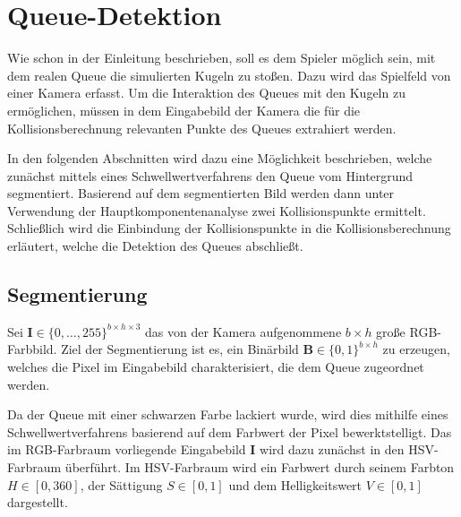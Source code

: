 \section{Queue-Detektion}

Wie schon in der Einleitung beschrieben, soll es dem Spieler möglich sein, mit dem realen Queue die simulierten Kugeln zu stoßen.
Dazu wird das Spielfeld von einer Kamera erfasst. 
Um die Interaktion des Queues mit den Kugeln zu ermöglichen, müssen in dem Eingabebild der Kamera die für die Kollisionsberechnung relevanten Punkte des Queues extrahiert werden.

In den folgenden Abschnitten wird dazu eine Möglichkeit beschrieben, welche zunächst mittels eines Schwellwertverfahrens den Queue vom Hintergrund segmentiert.
Basierend auf dem segmentierten Bild werden dann unter Verwendung der Hauptkomponentenanalyse zwei Kollisionspunkte ermittelt.
Schließlich wird die Einbindung der Kollisionspunkte in die Kollisionsberechnung erläutert, welche die Detektion des Queues abschließt.

\subsection{Segmentierung}
Sei $\textbf{I} \in \{0, \dots, 255\}^{b \times h \times 3}$ das von der Kamera aufgenommene $b \times h$ große RGB-Farbbild.
Ziel der Segmentierung ist es, ein Binärbild $\textbf{B} \in \{0,1\}^{b \times h}$ zu erzeugen, welches die Pixel im Eingabebild charakterisiert, die dem Queue zugeordnet werden.

Da der Queue mit einer schwarzen Farbe lackiert wurde, wird dies mithilfe eines Schwellwertverfahrens basierend auf dem Farbwert der Pixel bewerktstelligt.
Das im RGB-Farbraum vorliegende Eingabebild $\textbf{I}$ wird dazu zunächst in den HSV-Farbraum überführt. 
Im HSV-Farbraum wird ein Farbwert durch seinem Farbton $H \in [0, 360]$, der Sättigung $S \in [0, 1]$ und dem Helligkeitswert $V \in [0, 1]$ dargestellt.

